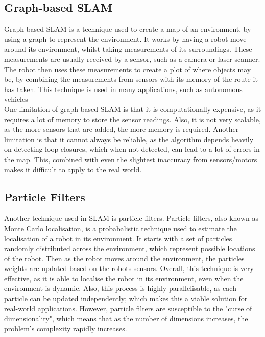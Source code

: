\documentclass[12pt]{article}
\begin{document}
\subsection{Graph-based SLAM}
Graph-based SLAM is a technique used to create a map of an environment, by using a graph to represent the environment. It
works by having a robot move around its environment, whilst taking measurements of its surroundings. These measurements
are usually received by a sensor, such as a camera or laser scanner. The robot then uses these measurements to create a
plot of where objects may be, by combining the measurements from sensors with its memory of the route it has taken. This
technique is used in many applications, such as autonomous vehicles\\
One limitation of graph-based SLAM is that it is computationally expensive, as it requires a lot of memory to store the
sensor readings. Also, it is not very scalable, as the more sensors that are added, the more memory is required. Another
limitation is that it cannot always be reliable, as the algorithm depends heavily on detecting loop closures, which when
not detected, can lead to a lot of errors in the map. This, combined with even the slightest inaccuracy from sensors/motors
makes it difficult to apply to the real world.

\subsection{Particle Filters}
Another technique used in SLAM is particle filters. Particle filters, also known as Monte Carlo localisation, is a probabalistic
technique used to estimate the localisation of a robot in its environment. It starts with a set of particles randomly distributed
across the environment, which represent possible locations of the robot. Then as the robot moves around the environment, the
particles weights are updated based on the robots sensors. Overall, this technique is very effective, as it is able to localise
the robot in its environment, even when the environment is dynamic. Also, this process is highly parallelisable, as each particle
can be updated independently; which makes this a viable solution for real-world applications. However, particle filters are
susceptible to the "curse of dimensionality", which means that as the number of dimensions increases, the problem's complexity
rapidly increases.
\end{document}
